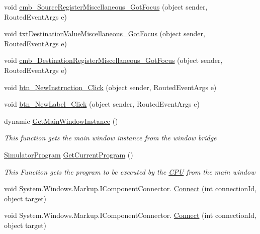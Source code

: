 \begin{DoxyCompactItemize}
\item 
void \hyperlink{class_c_p_u___o_s___simulator_1_1_instructions_window_aebeed4545e10bda489f1f73f4c09a20c}{cmb\+\_\+\+Source\+Register\+Miscellaneous\+\_\+\+Got\+Focus} (object sender, Routed\+Event\+Args e)
\item 
void \hyperlink{class_c_p_u___o_s___simulator_1_1_instructions_window_aceca94bcec64cbfd4cfe472e9dd34a58}{txt\+Destination\+Value\+Miscellaneous\+\_\+\+Got\+Focus} (object sender, Routed\+Event\+Args e)
\item 
void \hyperlink{class_c_p_u___o_s___simulator_1_1_instructions_window_aa05471f59f3884c72353dd2fd41fbabf}{cmb\+\_\+\+Destination\+Register\+Miscellaneous\+\_\+\+Got\+Focus} (object sender, Routed\+Event\+Args e)
\item 
void \hyperlink{class_c_p_u___o_s___simulator_1_1_instructions_window_a17e5a353f97cf65389c72595ea939033}{btn\+\_\+\+New\+Instruction\+\_\+\+Click} (object sender, Routed\+Event\+Args e)
\item 
void \hyperlink{class_c_p_u___o_s___simulator_1_1_instructions_window_a3e1ff6b516746dd5df024157e895a181}{btn\+\_\+\+New\+Label\+\_\+\+Click} (object sender, Routed\+Event\+Args e)
\item 
dynamic \hyperlink{class_c_p_u___o_s___simulator_1_1_instructions_window_acdb6ef31f0e3b786bd722ee33d384920}{Get\+Main\+Window\+Instance} ()
\begin{DoxyCompactList}\small\item\em This function gets the main window instance from the window bridge \end{DoxyCompactList}\item 
\hyperlink{class_c_p_u___o_s___simulator_1_1_c_p_u_1_1_simulator_program}{Simulator\+Program} \hyperlink{class_c_p_u___o_s___simulator_1_1_instructions_window_a5632ffbfa23fb81faa2ed89e6b1dabe3}{Get\+Current\+Program} ()
\begin{DoxyCompactList}\small\item\em This Function gets the program to be executed by the \hyperlink{namespace_c_p_u___o_s___simulator_1_1_c_p_u}{C\+P\+U} from the main window \end{DoxyCompactList}\item 
void System.\+Windows.\+Markup.\+I\+Component\+Connector. \hyperlink{class_c_p_u___o_s___simulator_1_1_instructions_window_a0efa7624a59a6abc64d0940ffaa100b0}{Connect} (int connection\+Id, object target)
\item 
void System.\+Windows.\+Markup.\+I\+Component\+Connector. \hyperlink{class_c_p_u___o_s___simulator_1_1_instructions_window_a0efa7624a59a6abc64d0940ffaa100b0}{Connect} (int connection\+Id, object target)
\end{DoxyCompactItemize}
